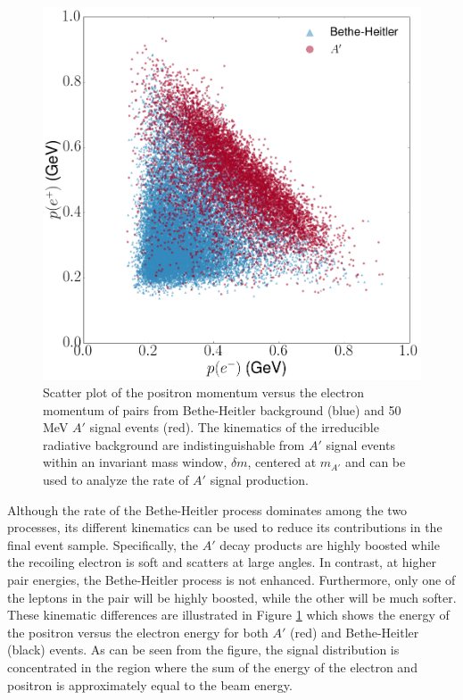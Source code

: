 \begin{figure}[ht]
    \centering
    \includegraphics[width=.8\textwidth]{images/bh_energy_cut.png}
    \caption{Scatter plot of the positron momentum versus the electron momentum 
             of pairs from Bethe-Heitler background (blue) and 50 MeV $A'$
             signal events (red). The kinematics of the irreducible radiative
         background are indistinguishable from $A'$ signal events within an 
         invariant mass window, $\delta m$, centered at $m_{A'}$ and can be 
        used to analyze the rate of $A'$ signal production.}
    \label{fig:ap_v_bethe}
\end{figure}
Although the rate of the Bethe-Heitler process dominates among the two 
processes, its different kinematics can be used to reduce its contributions in the final 
event sample.  Specifically, the $A'$ decay products are highly boosted while 
the recoiling electron is soft and scatters at large angles.  In contrast, 
at higher pair energies, the Bethe-Heitler process is not enhanced.  Furthermore,
only one of the leptons in the pair will be highly boosted, while the other
will be much softer.  
These kinematic differences are illustrated in Figure \ref{fig:ap_v_bethe} which
shows the energy of the positron versus the electron energy for both $A'$ (red)
and Bethe-Heitler (black) events.  As can be seen from the figure, the signal
distribution is concentrated in the region where the sum of the energy of the
electron and positron is approximately equal to the beam energy.


